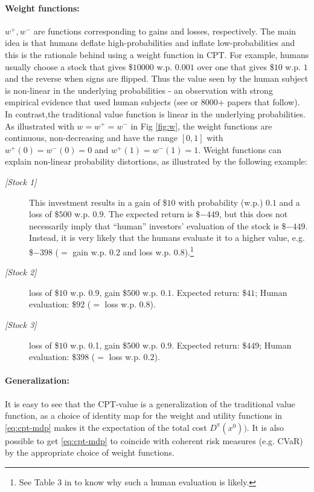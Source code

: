 \documentclass[11pt,letterpaper,english]{article}
\begin{document}
\paragraph{Weight functions:} $w^+, w^-$ are functions corresponding to gains and losses, respectively. 
The main idea is that humans deflate high-probabilities and inflate low-probabilities and this is the rationale behind using a weight function in CPT.
For example, humans usually choose a stock that gives \$$10000$ w.p. $0.001$ over one that gives \$$10$ w.p. $1$ and the reverse when signs are flipped. 
Thus the value seen by the human subject is non-linear in the underlying probabilities - an observation with strong empirical evidence that used human subjects (see \cite{tversky1992advances} or $8000$+ papers that follow).  In contrast,the traditional value function is linear in the underlying probabilities. 
As illustrated with $w=w^+=w^-$ in Fig \ref{fig:w}, the weight functions are continuous, non-decreasing and have the range $[0,1]$ with $w^+(0)=w^-(0)=0$ and $w^+(1)=w^-(1)=1$. Weight functions can explain non-linear probability distortions, as illustrated by the following example: 
\begin{description}
 \item[\textit{[Stock 1]}] This investment results in a gain of \$$10$ with probability (w.p.) $0.1$ and a loss of \$$500$ w.p. $0.9$. The expected return is \$$-449$, but this does not necessarily imply that ``human'' investors' evaluation of the stock is \$$-449$. Instead, it is very likely that the humans evaluate it to a higher value, e.g. \$$-398$ ($=$ gain w.p. $0.2$ and loss w.p. $0.8$).\footnote{See Table 3 in \cite{tversky1992advances} to know why such a human evaluation is likely.}
\item[\textit{[Stock 2]}] loss of \$$10$ w.p. $0.9$, gain \$$500$ w.p. $0.1$. Expected return: \$$41$; Human evaluation: \$$92$ ($=$ loss w.p. $0.8$).
\item[\textit{[Stock 3]}] loss of \$$10$ w.p. 0.1, gain \$$500$ w.p. $0.9$. Expected return: \$$449$; Human evaluation: \$$398$ ($=$ loss w.p. $0.2$). 
\end{description}


\paragraph{Generalization:} It is easy to see that the CPT-value is a generalization of the traditional value function, as a choice of identity map for the weight and utility functions in \eqref{eq:cpt-mdp} makes it the expectation of the total cost $D^\pi(x^0))$.  It is also possible to get \eqref{eq:cpt-mdp} to coincide with coherent risk measures (e.g. CVaR) by the appropriate choice of weight functions.
\end{document}
